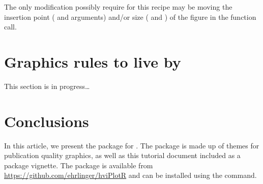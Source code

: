 \documentclass[nojss]{jss}\usepackage[]{graphicx}\usepackage[]{color}
\begin{document}
The only modification possibly require for this recipe may be moving the insertion point ( and  arguments) and/or size ( and ) of the figure in the  function call.
% 
% 
% 
% 
% 

\section{Graphics rules to live by}\label{S:rules}
This section is in progress\ldots

\section{Conclusions} \label{S:concl}

In this article, we present the  package for . The package is made up of  themes for publication quality graphics, as well as this tutorial document included as a package vignette. The package is available from \url{https://github.com/ehrlinger/hviPlotR} and can be installed using the  command. 



\end{document}
